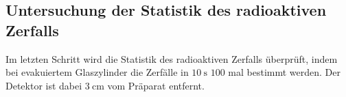 \subsection{Untersuchung der Statistik des radioaktiven Zerfalls}
Im letzten Schritt wird die Statistik des radioaktiven Zerfalls überprüft, indem bei evakuiertem Glaszylinder die Zerfälle in $\SI{10}{\second}$ $\num{100}$ mal bestimmt werden. Der Detektor ist dabei $\SI{3}{\centi\meter}$ vom Präparat entfernt.